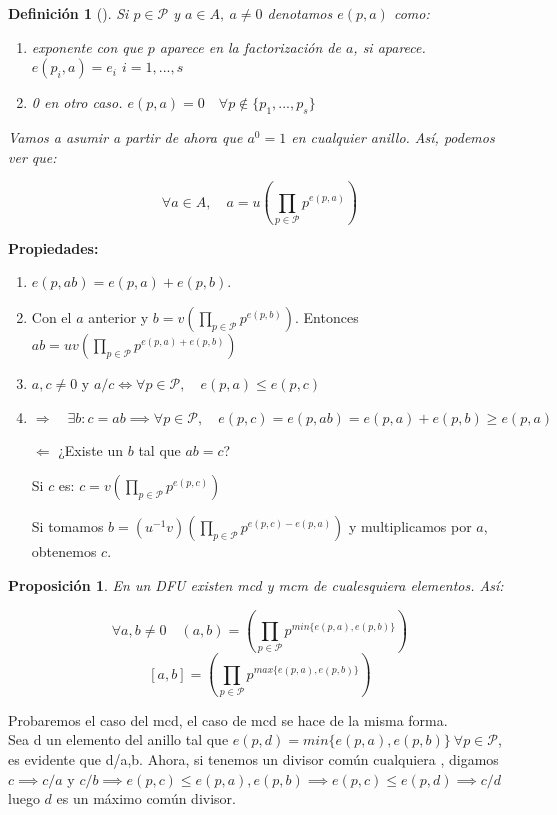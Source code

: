 \documentclass[11pt, a4paper, titlepage]{article}
\makeatletter
\renewenvironment{proof}[1][\proofname] {\vspace{-15pt}\par\pushQED{\qed}\normalfont\topsep6\p@\@plus6\p@\relax\trivlist\item[\hskip\labelsep\it#1\@addpunct{.}]\ignorespaces}{\popQED\endtrivlist\@endpefalse}
\theoremstyle{theorem-style}
\newtheorem*{nprop}{Proposición}
\theoremstyle{definition-style}
\newtheorem*{ndef}{Definición}
\theoremstyle{remark-style}
\theoremstyle{example-style}
\newenvironment{nlist}
{\begin{enumerate}
\renewcommand\labelenumi{(\emph{\roman{enumi})}}}
{\end{enumerate}}
\makeatother
\begin{document}
\begin{ndef}[]
	Si $p\in \mathcal{P}$ y $a \in A,\ a \ne 0$ denotamos $e(p,a)$ como:
	\begin{nlist}
	\item exponente con que $p$ aparece en la factorización de $a$, si aparece. $e(p_i,a) = e_i$ \quad $i = 1,...,s$
	\item 0 en otro caso. $e(p,a) = 0 \quad \forall p \notin \{p_1,...,p_s\}$

\end{nlist}
	
	Vamos a asumir a partir de ahora que $a^0  = 1 $ en cualquier anillo. Así, podemos ver que:
	
	$$\forall a \in A, \quad a = u(\prod _{p \in \mathcal{P}}p^{e(p,a)})$$
\end{ndef}

\textbf{Propiedades:}
\begin{nlist}
	\item $e(p,ab) = e(p,a) + e(p,b)$.\\
	
	\begin{proof}
	
	Con el $a$ anterior y $b= v(\prod _{p \in \mathcal{P}}p^{e(p,b)})$. Entonces $ab = uv(\prod _{p \in \mathcal{P}}p^{e(p,a)+ e(p,b)})$
\end{proof}

\item $a,c \ne 0$ y $a/c \iff \forall p \in \mathcal{P}, \quad e(p,a) \leq e(p,c)$\\

\begin{proof}
	$\boxed{\Rightarrow} \quad \exists b: c =ab \implies \forall p \in \mathcal{P}, \quad e(p,c) = e(p,ab) = e(p,a)+e(p,b) \geq e(p,a) $
	
	$\boxed{\Leftarrow} $ ¿Existe un $b$ tal que $ab= c$? 
	
	Si $c$ es: $c = v(\prod _{p \in \mathcal{P}}p^{e(p,c)})$
	
	Si tomamos $b = (u^{-1}v)(\prod _{p \in \mathcal{P}}p^{e(p,c) - e(p,a)}) $ y multiplicamos por $a$, obtenemos $c$.
\end{proof}
\end{nlist}

\begin{nprop}
En un DFU existen mcd y mcm de cualesquiera elementos. Así:

\[
\forall a,b \ne 0 \quad (a,b) = (\prod _{p \in \mathcal{P}}p^{min\{e(p,a),e(p,b)\}})
\]
\[
[a,b] = (\prod _{p \in \mathcal{P}}p^{max\{e(p,a),e(p,b)\}})
\]
	
\end{nprop}
\begin{proof}
	Probaremos el caso del mcd, el caso de mcd se hace de la misma forma.\\
	Sea d un elemento del anillo tal que $e(p,d) = min\{e(p,a), e(p,b)\}\ \forall p \in \mathcal{P}$, es evidente que d/a,b. Ahora, si tenemos un divisor común cualquiera , digamos $c \implies c/a$  y $c/b \implies e(p,c) \leq e(p,a),e(p,b) \implies e(p,c) \leq e(p,d) \implies c/d$ luego $d$ es un máximo común divisor.
\end{proof}
\end{document}
